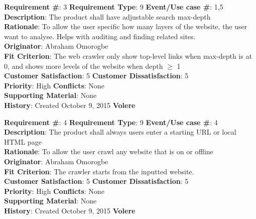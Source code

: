\documentclass[titlepage]{article}
\begin{document}
\begin{framed}
\textbf{Requirement \#}: 3 \hfill \textbf{Requirement Type}: 9 \hfill\textbf{Event/Use case \#}: 1,5 \hfill\\
\textbf{Description}:  The product shall have adjustable search max-depth\\
\textbf{Rationale}: To allow the user specific how many layers of the website, the user want to analyse. Helps with auditing and finding related sites.\\
\textbf{Originator}: Abraham Omorogbe\\
\textbf{Fit Criterion}: The web crawler only show top-level links when max-depth is at 0, and shows more levels of the website when depth $\geq$ 1\\
\textbf{Customer Satisfaction}: 5 \hfill 	\textbf{Customer Dissatisfaction}: 5 \hfill\\
\textbf{Priority}: High \hfill \textbf{Conflicts}: None \hfill \\
\textbf{Supporting Material}: None\\
\textbf{History}: Created October 9, 2015 \hfill	 \textbf{Volere}\hfill

\end{framed}

\begin{framed}
\textbf{Requirement \#}: 4 \hfill \textbf{Requirement Type}: 9 \hfill\textbf{Event/Use case \#}: 4 \hfill\\
\textbf{Description}:  The product shall always users enter a starting URL or local HTML page\\
\textbf{Rationale}: To allow the user crawl any website that is on or offline\\
\textbf{Originator}: Abraham Omorogbe\\
\textbf{Fit Criterion}: The crawler starts from the inputted website.\\
\textbf{Customer Satisfaction}: 5 \hfill 	\textbf{Customer Dissatisfaction}: 5 \hfill\\
\textbf{Priority}: High \hfill \textbf{Conflicts}: None \hfill 		\\
\textbf{Supporting Material}: None\\
\textbf{History}: Created October 9, 2015 \hfill	 \textbf{Volere}\hfill

\end{framed}
\end{document}
